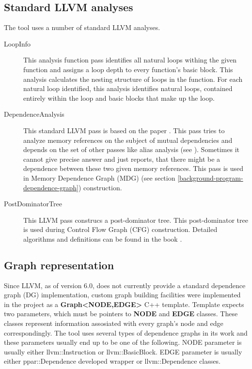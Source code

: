 \subsection{Standard LLVM analyses} 
\label{ppar-tool-standard-llvm-analyses}
\qquad The tool uses a number of standard LLVM analyses.
\begin{description}
\item [LoopInfo] This analysis function pass identifies all natural loops withing the given function and assigns a loop depth to every function's basic block. This analysis calculates the nesting structure of loops in the function. For each natural loop identified, this analysis identifies natural loops, contained entirely within the loop and basic blocks that make up the loop.
\item [DependenceAnalysis] This standard LLVM pass is based on the paper \cite{practical-dep-testing-paper}. This pass tries to analyze memory references on the subject of mutual dependencies and depends on the set of other passes like alias analysis (see \cite{muchnick-compilers-book}). Sometimes it cannot give precise answer and just reports, that there might be a dependence between these two given memory references. This pass is used in Memory Dependence Graph (MDG) (see section \ref{background-program-dependence-graph}) construction.  
\item [PostDominatorTree] This LLVM pass construcs a post-dominator tree. This post-dominator tree is used during Control Flow Graph (CFG) construction. Detailed algorithms and definitions can be found in the book \cite{muchnick-compilers-book}.
\end{description} 

\subsection{Graph representation} \label{ppar-tool-graph-representation}
\qquad Since LLVM, as of version 6.0, does not currently provide a standard dependence graph (DG) implementation, custom graph building facilities were implemented in the project as a \textbf{Graph\textless \textsc{NODE},\textsc{EDGE}\textgreater} C++ template. Template expects two parameters, which must be pointers to \textbf{NODE} and \textbf{EDGE} classes. These classes represent information assosiated with every graph's node and edge correspondingly. The tool uses several types of dependence graphs in its work and these parameters usually end up to be one of the following. NODE parameter is usually either llvm::Instruction or llvm::BasicBlock. EDGE parameter is usually either ppar::Dependence developed wrapper or llvm::Dependence classes.

